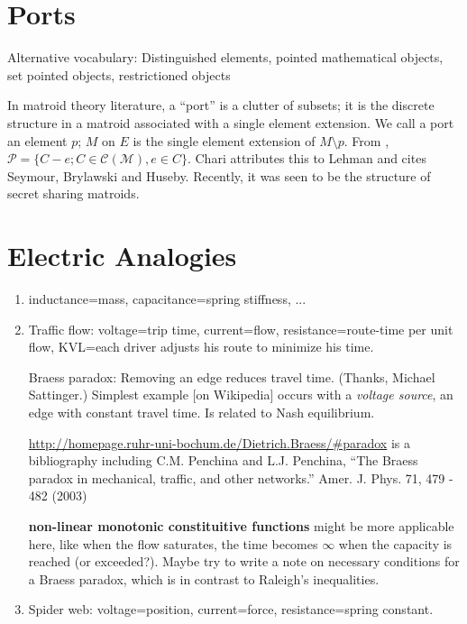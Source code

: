\documentclass{article}
\begin{document}
\section{Ports}

Alternative vocabulary: 
Distinguished elements, pointed mathematical objects, set pointed objects, 
restrictioned objects

In matroid theory literature, a ``port'' is a clutter of subsets; it is the 
discrete structure in a matroid associated with a single element extension.
We call a port an element $p$; $M$ on $E$ is the single element extension
of $M\setminus p$.  From \cite{MatroidPortsSteinerShellChari}, 
$\mathcal{P}= \{ C - e; C\in\mathcal{C}(\mathcal{M}), e\in C\}$.
Chari attributes this to Lehman and cites Seymour, Brylawski and Huseby.
Recently, it was seen to be the structure of secret sharing matroids.

\section{Electric Analogies}

\begin{enumerate}
\item inductance=mass, capacitance=spring stiffness, ...
\item Traffic flow: voltage=trip time, current=flow, resistance=route-time 
per unit flow, KVL=each driver adjusts his route to minimize his time.

Braess paradox: Removing an edge reduces travel time. (Thanks, Michael 
Sattinger.)
Simplest example [on Wikipedia] occurs with a \textit{voltage source}, an edge
with constant travel time.  Is related to Nash equilibrium.

\url{http://homepage.ruhr-uni-bochum.de/Dietrich.Braess/#paradox}
is a bibliography including 
C.M. Penchina and L.J. Penchina,
   ``The Braess paradox in mechanical, traffic, and other networks.''
\cite{BraessAJPhy}
   Amer. J. Phys. 71, 479 - 482 (2003)

\textbf{non-linear monotonic constituitive functions} might be more applicable
here, like when the flow saturates, the time becomes $\infty$ when the capacity
is reached (or exceeded?).  Maybe try to write a note on necessary 
conditions for a Braess paradox, which is in contrast to Raleigh's 
inequalities.
 
\item Spider web: voltage=position, current=force, resistance=spring constant.
\end{enumerate}
\end{document}
